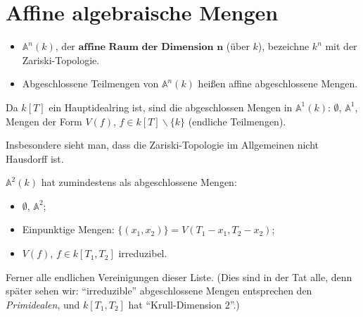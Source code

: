 
\section{Affine algebraische Mengen}
\label{sec:algebraische-mengen}
\begin{defn}
  \label{def:algebraische-mengen}
  \mbox{}
  \begin{itemize}
  \item $\mathbb{A}^{n}(k)$, der $\textbf{affine Raum der Dimension n}$ (über $k$),
    bezeichne $k^{n}$ mit der Zariski-Topologie.
  \item Abgeschlossene Teilmengen von $\mathbb{A}^{n}(k)$ heißen affine abgeschlossene
    Mengen.
  \end{itemize}
\end{defn}
\begin{example}
  \label{bsp:algebraische-mengen-dim1}
  Da $k[T]$ ein Hauptidealring ist, sind die abgeschlossen Mengen in
  $\mathbb{A}^{1}(k)$: $\emptyset$, $\mathbb{A}^{1}$, Mengen der
  Form $V(f)$, $f\in k[T]\backslash\{k\}$ (endliche Teilmengen).%
  \begin{comment}
    Für $f\in k$ ist $V(f)=\mathbb{A}^{1}$, denn die Einheiten im Polynomring
    $k[T]$ sind gegeben durch $k^{\times}$, und Ideale erzeugt von einer
    Einheit bilden den ganzen Ring. (siehe Algebra 1)
  \end{comment}
  {} Insbesondere sieht man, dass die Zariski-Topologie im Allgemeinen
  nicht Hausdorff ist. 
\end{example}
% 
\begin{example}
  \label{bsp:algebraische-mengen-dim2}
  $\mathbb{A}^{2}(k)$ hat zumindestens als abgeschlossene Mengen:
  \begin{itemize}
  \item $\emptyset$, $\mathbb{A}^{2}$;
  \item Einpunktige Mengen: $\{(x_{1},x_{2})\}=V(T_{1}-x_{1},T_{2}-x_{2})$;
  \item $V(f)$, $f\in k[T_{1},T_{2}]$ irreduzibel. 
  \end{itemize}
  Ferner alle endlichen Vereinigungen dieser Liste. (Dies sind in der
  Tat alle, denn später sehen wir: ``irreduzible'' abgeschlossene
  Mengen entsprechen den \emph{Primidealen}, und $k[T_{1},T_{2}]$ hat
  ``Krull-Dimension $2$''.)
\end{example}

